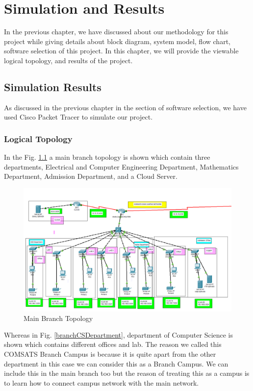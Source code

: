 \chapter{Simulation and Results}
\label{chap4}
In the previous chapter, we have discussed about our methodology for this project while giving details about block diagram, system model, flow chart, software selection of this project. In this chapter, we will provide the viewable logical topology, and results of the project.
\section{Simulation Results}
As discussed in the previous chapter in the section of software selection, we have used Cisco Packet Tracer to simulate our project.
\subsection{Logical Topology}
In the Fig. \ref{mainBranchCampus} a main branch topology is shown which contain three departments, Electrical and Computer Engineering Department, Mathematics Department, Admission Department, and a Cloud Server.
\begin{figure}[H]  %
\begin{center}
\includegraphics[scale=0.43]{Chapter4/mainBranchCampus}
\caption{Main Branch Topology}
\label{mainBranchCampus}
\end{center}
\end{figure}
Whereas in Fig. \ref{branchCSDepartment}, department of Computer Science is shown which contains different offices and lab. The reason we called this COMSATS Branch Campus is because it is quite apart from the other department in this case we can consider this as a Branch Campus. We can include this in the main branch too but the reason of treating this as a campus is to learn how to connect campus network with the main network.
